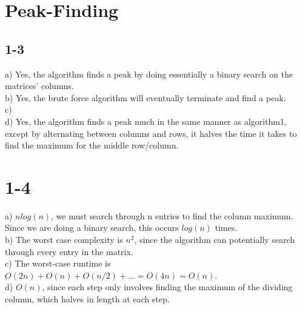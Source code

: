 \documentclass[10pt,a4paper]{article}
\begin{document}
\section{Peak-Finding}
\subsection*{1-3}
a) Yes, the algorithm finds a peak by doing essentially a binary search on the matrices' columns.\\
b) Yes, the brute force algorithm will eventually terminate and find a peak.\\
c)\\
d) Yes, the algorithm finds a peak much in the same manner as algorithm1, except by alternating between columns and rows, it halves the time it takes to find the maximum  for the middle row/column.
\section{1-4}
a) $nlog(n)$, we must search through n entries to find the column maximum. Since we are doing a binary search, this occurs $log(n)$ times.\\
b) The worst case complexity is $n^2$, since the algorithm can potentially search through every entry in the matrix.\\
c) The worst-case runtime is $O(2n)+O(n)+O(n/2)+...= O(4n)= O(n)$. \\
d) $O(n)$, since each step only involves finding the maximum of the dividing column, which halves in length at each step.
\end{document}
